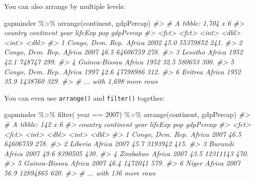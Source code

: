 \documentclass[
]{book}
\newenvironment{Shaded}{\begin{snugshade}}{\end{snugshade}}
\newcommand{\CommentTok}[1]{\textcolor[rgb]{0.56,0.35,0.01}{\textit{#1}}}
\newcommand{\DecValTok}[1]{\textcolor[rgb]{0.00,0.00,0.81}{#1}}
\newcommand{\FunctionTok}[1]{\textcolor[rgb]{0.00,0.00,0.00}{#1}}
\newcommand{\NormalTok}[1]{#1}
\newcommand{\SpecialCharTok}[1]{\textcolor[rgb]{0.00,0.00,0.00}{#1}}
\begin{document}
You can also arrange by multiple levels:

\begin{Shaded}
\begin{Highlighting}[]
\NormalTok{gapminder }\SpecialCharTok{\%\textgreater{}\%} \FunctionTok{arrange}\NormalTok{(continent, gdpPercap)}
\CommentTok{\#\textgreater{} \# A tibble: 1,704 x 6}
\CommentTok{\#\textgreater{}   country          continent  year lifeExp      pop gdpPercap}
\CommentTok{\#\textgreater{}   \textless{}fct\textgreater{}            \textless{}fct\textgreater{}     \textless{}int\textgreater{}   \textless{}dbl\textgreater{}    \textless{}int\textgreater{}     \textless{}dbl\textgreater{}}
\CommentTok{\#\textgreater{} 1 Congo, Dem. Rep. Africa     2002    45.0 55379852      241.}
\CommentTok{\#\textgreater{} 2 Congo, Dem. Rep. Africa     2007    46.5 64606759      278.}
\CommentTok{\#\textgreater{} 3 Lesotho          Africa     1952    42.1   748747      299.}
\CommentTok{\#\textgreater{} 4 Guinea{-}Bissau    Africa     1952    32.5   580653      300.}
\CommentTok{\#\textgreater{} 5 Congo, Dem. Rep. Africa     1997    42.6 47798986      312.}
\CommentTok{\#\textgreater{} 6 Eritrea          Africa     1952    35.9  1438760      329.}
\CommentTok{\#\textgreater{} \# ... with 1,698 more rows}
\end{Highlighting}
\end{Shaded}

You can even use \texttt{arrange()} and \texttt{filter()} together:

\begin{Shaded}
\begin{Highlighting}[]
\NormalTok{gapminder }\SpecialCharTok{\%\textgreater{}\%} \FunctionTok{filter}\NormalTok{( year }\SpecialCharTok{==} \DecValTok{2007}\NormalTok{) }\SpecialCharTok{\%\textgreater{}\%} \FunctionTok{arrange}\NormalTok{(continent, gdpPercap)}
\CommentTok{\#\textgreater{} \# A tibble: 142 x 6}
\CommentTok{\#\textgreater{}   country          continent  year lifeExp      pop gdpPercap}
\CommentTok{\#\textgreater{}   \textless{}fct\textgreater{}            \textless{}fct\textgreater{}     \textless{}int\textgreater{}   \textless{}dbl\textgreater{}    \textless{}int\textgreater{}     \textless{}dbl\textgreater{}}
\CommentTok{\#\textgreater{} 1 Congo, Dem. Rep. Africa     2007    46.5 64606759      278.}
\CommentTok{\#\textgreater{} 2 Liberia          Africa     2007    45.7  3193942      415.}
\CommentTok{\#\textgreater{} 3 Burundi          Africa     2007    49.6  8390505      430.}
\CommentTok{\#\textgreater{} 4 Zimbabwe         Africa     2007    43.5 12311143      470.}
\CommentTok{\#\textgreater{} 5 Guinea{-}Bissau    Africa     2007    46.4  1472041      579.}
\CommentTok{\#\textgreater{} 6 Niger            Africa     2007    56.9 12894865      620.}
\CommentTok{\#\textgreater{} \# ... with 136 more rows}
\end{Highlighting}
\end{Shaded}
\end{document}
